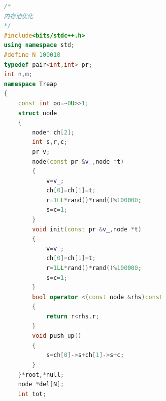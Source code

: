 \documentclass[UTF8,a4paper,titlepage]{ctexart}
\begin{document}
\begin{lstlisting}[language=C++]
/*
内存池优化
*/
#include<bits/stdc++.h>
using namespace std;
#define N 100010
typedef pair<int,int> pr;
int n,m;
namespace Treap
{
    const int oo=~0U>>1;
    struct node
    {
        node* ch[2];
        int s,r,c;
        pr v;
        node(const pr &v_,node *t)
        {
            v=v_;
            ch[0]=ch[1]=t;
            r=1LL*rand()*rand()%100000;
            s=c=1;
        }
        void init(const pr &v_,node *t)
        {
            v=v_;
            ch[0]=ch[1]=t;
            r=1LL*rand()*rand()%100000;
            s=c=1;
        }
        bool operator <(const node &rhs)const
        {
            return r<rhs.r;
        }
        void push_up()
        {
            s=ch[0]->s+ch[1]->s+c;
        }
    }*root,*null;
    node *del[N];
    int tot;


\end{lstlisting}
\end{document}
